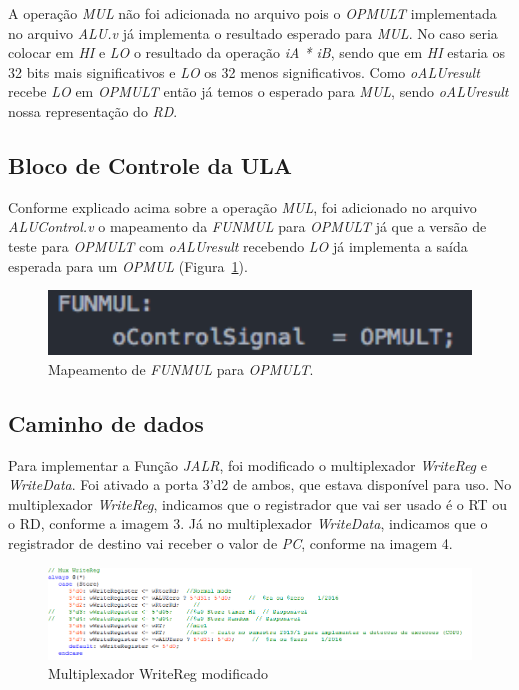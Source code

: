 \documentclass[12pt]{article}
\begin{document}
A operação \textit{MUL} não foi adicionada no arquivo pois o \textit{OPMULT} implementada no arquivo \textit{ALU.v} já implementa o resultado esperado para \textit{MUL}. No caso seria colocar em \textit{HI} e \textit{LO} o resultado da operação \textit{iA * iB}, sendo que em \textit{HI} estaria os 32 bits mais significativos e \textit{LO} os 32 menos significativos. Como \textit{oALUresult} recebe \textit{LO} em \textit{OPMULT} então já temos o esperado para \textit{MUL}, sendo \textit{oALUresult} nossa representação do \textit{RD}.

\subsection{Bloco de Controle da ULA}
\label{subsec:alucontrol}

Conforme explicado acima sobre a operação \textit{MUL}, foi adicionado no arquivo \textit{ALUControl.v} o mapeamento da \textit{FUNMUL} para \textit{OPMULT} já que a versão de teste para \textit{OPMULT} com \textit{oALUresult} recebendo \textit{LO} já implementa a saída esperada para um \textit{OPMUL} (Figura~\ref{fig:controlfunc}). 

\begin{figure}[H]
	\flushleft
	\includegraphics[width=1\textwidth]{controlfunc.png}
	\caption{Mapeamento de \textit{FUNMUL} para \textit{OPMULT}.}
	\label{fig:controlfunc}
\end{figure}


\subsection{Caminho de dados}
\label{subsec:datapath}

Para implementar a Função \textit{JALR}, foi modificado o multiplexador \textit{WriteReg} e \textit{WriteData}. Foi ativado a porta 3'd2 de ambos, que estava disponível para uso. No multiplexador \textit{WriteReg}, indicamos que o registrador que vai ser usado é o RT ou o RD, conforme a imagem 3. Já no multiplexador \textit{WriteData}, indicamos que o registrador de destino vai receber o valor de \textit{PC}, conforme na imagem 4.    

\begin{figure}[H]
	\flushleft
	\includegraphics[width=1\textwidth]{MUXWR.png}
	\caption{Multiplexador WriteReg modificado}
	\label{fig:pest}
\end{figure}
\end{document}

